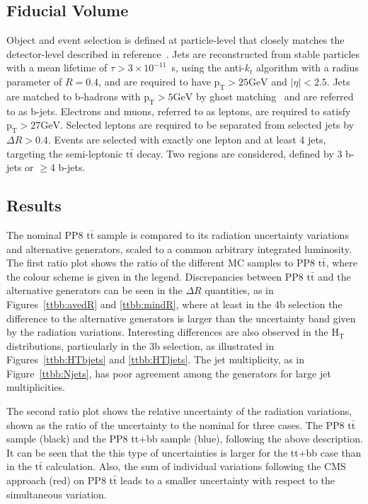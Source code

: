 \subsection{Fiducial Volume}
Object and event selection is defined at particle-level that closely matches the detector-level described in reference~\cite{HIGG-2017-03}. Jets are reconstructed from stable particles with a mean lifetime of $\tau > 3\times 10^{-11}$~s, using the anti-$k_t$ algorithm with a radius parameter of $R=0.4$, and are required to have $\mathrm{p_{T}>25 GeV}$ and $|\eta|< 2.5$. Jets are matched to b-hadrons with $\mathrm{p_{T}>5 GeV}$ by ghost matching~\cite{Cacciari:2008gn} and are referred to as b-jets. Electrons and muons, referred to as leptons, are required to satisfy $\mathrm{p_{T}>27 GeV}$. Selected leptons are required to be separated from selected jets by $\Delta R>0.4$. Events are selected with exactly one lepton and at least 4 jets, targeting the semi-leptonic $\mathrm{t\bar{t}}$ decay.
Two regions are considered, defined by 3 b-jets or $\geq$4 b-jets.

\subsection{Results}
The nominal PP8 $\mathrm{t\bar{t}}$ sample is compared to its radiation uncertainty variations and alternative generators, scaled to a common arbitrary integrated luminosity.
The first ratio plot shows the ratio of the different MC samples to PP8 $\mathrm{t\bar{t}}$, where the colour scheme is given in the legend.
Discrepancies between PP8 $\mathrm{t\bar{t}}$ and the alternative generators can be seen in the $\Delta R$ quantities, as in Figures~\ref{ttbb:avedR} and \ref{ttbb:mindR}, where at least in the 4b selection the difference to the alternative generators is larger than the uncertainty band given by the radiation variations.  
Interesting differences are also observed in the $\mathrm{H_T}$ distributions, particularly in the 3b selection, as illustrated in Figures~\ref{ttbb:HTbjets} and \ref{ttbb:HTljets}. The jet multiplicity, as in Figure~\ref{ttbb:Njets}, has poor agreement among the generators for large jet multiplicities.

The second ratio plot shows the relative uncertainty of the radiation variations, shown as the ratio of the uncertainty to the nominal for three cases. The PP8 $\mathrm{t\bar{t}}$ sample (black) and the PP8 tt+bb sample (blue), following the above description. It can be seen that the this type of uncertainties is larger for the tt+bb case than in the $\mathrm{t\bar{t}}$ calculation.
Also, the sum of individual variations following the CMS approach (red) on PP8 $\mathrm{t\bar{t}}$ leads to a smaller uncertainty with respect to the simultaneous variation.



